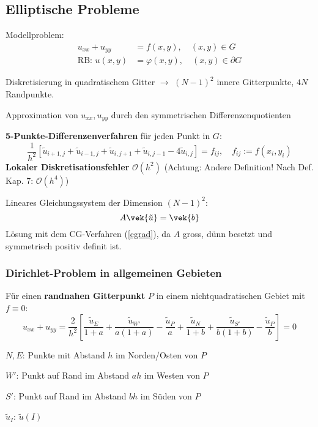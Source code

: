 	\subsection{Elliptische Probleme}
		Modellproblem:
		\begin{align*}
			u_{xx} + u_{yy} &= f(x,y),\quad (x,y) \in G \\
			\text{RB: } u(x,y) &= \varphi(x,y),\quad (x,y) \in \partial G
		\end{align*}
		\begin{tightenumerate}
			\item Diskretisierung in quadratischem Gitter $\rightarrow$ $(N-1)^2$ innere Gitterpunkte, $4N$ Randpunkte.
			\item Approximation von $u_{xx}, u_{yy}$ durch den symmetrischen Differenzenquotienten
			\item \textbf{5-Punkte-Differenzenverfahren} für jeden Punkt in $G$:
				\[
					\frac{1}{h^2}\left[ \tilde u_{i+1,j} + \tilde u_{i-1,j} + \tilde u_{i,j+1} + \tilde u_{i,j-1} - 4 \tilde u_{i,j}\right] = f_{ij}, \quad f_{ij} := f(x_i,y_i)
				\]
				\textbf{Lokaler Diskretisationsfehler} $\mathcal{O}(h^2)$ (Achtung: Andere Definition! Nach Def. Kap. 7: $\mathcal{O}(h^4)$)
			\item Lineares Gleichungssystem der Dimension $(N-1)^2$:
				\[
					A \vek{\tilde u} = \vek{b}
				\]
				Lösung mit dem CG-Verfahren (\ref{cgrad}), da $A$ gross, dünn besetzt und symmetrisch positiv definit ist.
		\end{tightenumerate}

		\subsubsection{Dirichlet-Problem in allgemeinen Gebieten}
			Für einen \textbf{randnahen Gitterpunkt} $P$ in einem nichtquadratischen Gebiet mit $f \equiv 0$:
			\[
				u_{xx} + u_{yy} = \frac{2}{h^2}\left[ \frac{\tilde u_E}{1+a} + \frac{\tilde u_{W'}}{a(1+a)} - \frac{\tilde u_P}{a} + \frac{\tilde u_N}{1+b} + \frac{\tilde u_{S'}}{b(1+b)} - \frac{\tilde u_P}{b} \right] = 0
			\]

			\begin{tightitemize}
				\item[$N,E$:] Punkte mit Abstand $h$ im Norden/Osten von $P$
				\item[$W'$:] Punkt auf Rand im Abstand $ah$ im Westen von $P$
				\item[$S'$:] Punkt auf Rand im Abstand $bh$ im Süden von $P$
				\item[$\tilde u_I$:] $\tilde u (I)$
			\end{tightitemize}

